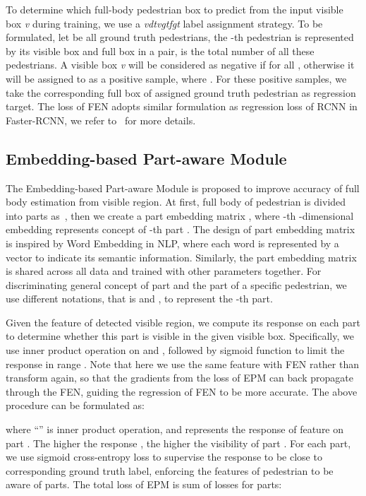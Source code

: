 \documentclass[10pt,twocolumn,letterpaper]{article}
\begin{document}
To determine which full-body pedestrian box to predict from the input visible box \textit{v} during training, we use a \textit{vdtvgtfgt} label assignment strategy. To be formulated, let  be all ground truth pedestrians, the -th pedestrian  is represented by its visible box  and full box  in a pair,  is the total number of all these pedestrians. A visible box \textit{v} will be considered as negative if  for all , otherwise it will be assigned to  as a positive sample, where . For these positive samples, we take the corresponding full box of assigned ground truth pedestrian as regression target. The loss of FEN  adopts similar formulation as regression loss of RCNN in Faster-RCNN, we refer to~\cite{ren2015faster} for more details.


\subsection{Embedding-based Part-aware Module}
The Embedding-based Part-aware Module is proposed to improve accuracy of full body estimation from visible region. At first, full body of pedestrian is divided into  parts as~\cite{zhang2018Occlusionaware}, then we create a part embedding matrix , where -th -dimensional embedding  represents concept of -th part . The design of part embedding matrix is inspired by Word Embedding in NLP, where each word is represented by a vector to indicate its semantic information. Similarly, the part embedding matrix is shared across all data and trained with other parameters together. For discriminating
general concept of part and the part of a specific pedestrian, we use different notations, that is  and , to represent the -th part.

Given the feature of detected visible region, we compute its response on each part to determine whether this part is visible in the given visible box. Specifically, we use inner product operation on  and , followed by sigmoid function to limit the response in range . Note that here we use the same feature  with FEN rather than transform  again, so that the gradients from the loss of EPM can back propagate through the FEN, guiding the regression of FEN to be more accurate. The above procedure can be formulated as:

where ``'' is inner product operation, and  represents the response of feature  on part . The higher the response , the higher the visibility of part . For each part, we use sigmoid cross-entropy loss to supervise the response to be close to corresponding ground truth label, enforcing the features of pedestrian to be aware of parts. The total loss of EPM is sum of losses for  parts:
\end{document}
